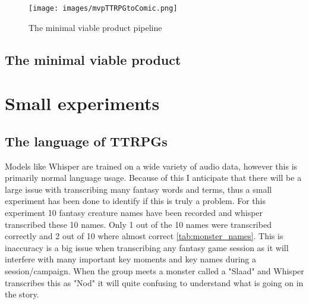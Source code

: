 \begin{figure}[!htp]
	\centering
	\texttt{[image: images/mvpTTRPGtoComic.png]}
	\caption[pipeline for the minimal viable product] {The minimal viable product pipeline}
	\label{fig:MVPpipeline}
\end{figure}

\subsection{The minimal viable product}

\section{Small experiments}

\subsection{The language of TTRPGs}
Models like Whisper are trained on a wide variety of audio data, however this is primarily normal language usage. Because of this I anticipate that there will be a large issue with transcribing many fantasy words and terms, thus a small experiment has been done to identify if this is truly a problem. For this experiment 10 fantasy creature names have been recorded and whisper transcribed these 10 names. Only 1 out of the 10 names were transcribed correctly and 2 out of 10 where almost correct \ref{tab:monster_names}. This is inaccuracy is a big issue when transcribing any fantasy game session as it will interfere with many important key moments and key names during a session/campaign. When the group meets a monster called a "Slaad" and Whisper transcribes this as "Nod" it will quite confusing to understand what is going on in the story.

